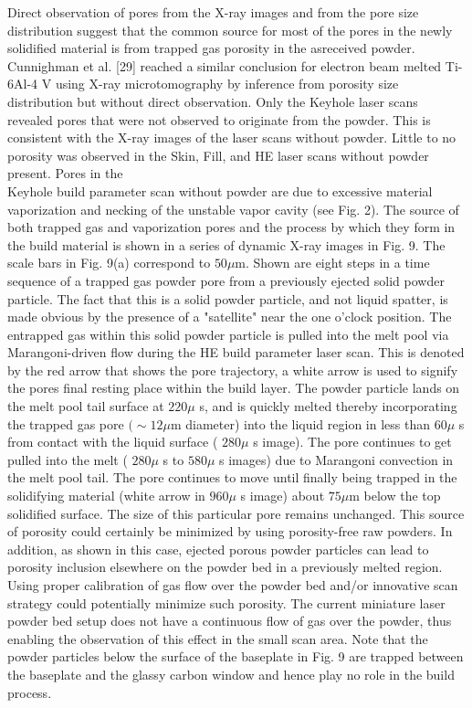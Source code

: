 \documentclass[10pt]{article}
\begin{document}
Direct observation of pores from the X-ray images and from the pore size distribution suggest that the common source for most of the pores in the newly solidified material is from trapped gas porosity in the asreceived powder. Cunnighman et al. [29] reached a similar conclusion for electron beam melted Ti-6Al-4 V using X-ray microtomography by inference from porosity size distribution but without direct observation. Only the Keyhole laser scans revealed pores that were not observed to originate from the powder. This is consistent with the X-ray images of the laser scans without powder. Little to no porosity was observed in the Skin, Fill, and HE laser scans without powder present. Pores in the\\
Keyhole build parameter scan without powder are due to excessive material vaporization and necking of the unstable vapor cavity (see Fig. 2). The source of both trapped gas and vaporization pores and the process by which they form in the build material is shown in a series of dynamic X-ray images in Fig. 9. The scale bars in Fig. 9(a) correspond to $50 \mu \mathrm{m}$. Shown are eight steps in a time sequence of a trapped gas powder pore from a previously ejected solid powder particle. The fact that this is a solid powder particle, and not liquid spatter, is made obvious by the presence of a "satellite" near the one o'clock position. The entrapped gas within this solid powder particle is pulled into the melt pool via Marangoni-driven flow during the HE build parameter laser scan. This is denoted by the red arrow that shows the pore trajectory, a white arrow is used to signify the pores final resting place within the build layer. The powder particle lands on the melt pool tail surface at $220 \mu$ s, and is quickly melted thereby incorporating the trapped gas pore $(\sim 12 \mu \mathrm{m}$ diameter) into the liquid region in less than $60 \mu$ s from contact with the liquid surface ( $280 \mu$ s image). The pore continues to get pulled into the melt ( $280 \mu$ s to $580 \mu$ s images) due to Marangoni convection in the melt pool tail. The pore continues to move until finally being trapped in the solidifying material (white arrow in $960 \mu$ s image) about $75 \mu \mathrm{m}$ below the top solidified surface. The size of this particular pore remains unchanged. This source of porosity could certainly be minimized by using porosity-free raw powders. In addition, as shown in this case, ejected porous powder particles can lead to porosity inclusion elsewhere on the powder bed in a previously melted region. Using proper calibration of gas flow over the powder bed and/or innovative scan strategy could potentially minimize such porosity. The current miniature laser powder bed setup does not have a continuous flow of gas over the powder, thus enabling the observation of this effect in the small scan area. Note that the powder particles below the surface of the baseplate in Fig. 9 are trapped between the baseplate and the glassy carbon window and hence play no role in the build process.
\end{document}
